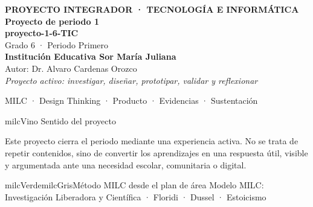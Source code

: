 \documentclass[11pt,letterpaper]{article}
\begin{document}
\thispagestyle{empty}

\vspace*{.85cm}
\begin{tcolorbox}[
  enhanced,colback=milcVino,colframe=milcVino,arc=12mm,width=.86\textwidth,
  boxrule=0pt,left=12mm,right=12mm,top=11mm,bottom=11mm,center,
  overlay={\draw[milcMagenta,line width=2pt,dash pattern=on 9pt off 8pt,rounded corners=10mm]
  ([xshift=7mm,yshift=-7mm]frame.north west) rectangle ([xshift=-7mm,yshift=7mm]frame.south east);}]
  \centering
  {\sffamily\bfseries\color{white}\fontsize{15}{17}\selectfont PROYECTO INTEGRADOR · TECNOLOGÍA E INFORMÁTICA}\\[1.0cm]
  {\sffamily\bfseries\color{white}\fontsize{30}{33}\selectfont Proyecto de periodo 1}\\[3mm]
  {\sffamily\bfseries\color{milcMostaza}\fontsize{25}{28}\selectfont proyecto-1-6-TIC}\\[8mm]
  {\sffamily\color{white}\Large Grado 6 · Periodo Primero}\\[1.0cm]
  {\sffamily\bfseries\color{white}\large Institución Educativa Sor María Juliana}\\[2mm]
  {\sffamily\color{white}Autor: Dr. Alvaro Cardenas Orozco}\\[4mm]
  {\sffamily\itshape\color{white}Proyecto activo: investigar, diseñar, prototipar, validar y reflexionar}
\end{tcolorbox}
\vfill
\begin{tcolorbox}[enhanced,colback=milcVino!72!black,colframe=milcVino!72!black,arc=5mm,boxrule=0pt,width=.86\textwidth,left=6mm,right=6mm,top=4mm,bottom=4mm,center]
{\color{white}\sffamily\small MILC · Design Thinking · Producto · Evidencias · Sustentación}
\end{tcolorbox}

\newpage
\begin{titlebox}{milcVino}
Sentido del proyecto
\end{titlebox}
\begin{multicols}{2}
Este proyecto cierra el periodo mediante una experiencia activa. No se trata de repetir contenidos, sino de convertir los aprendizajes en una respuesta útil, visible y argumentada ante una necesidad escolar, comunitaria o digital.

\columnbreak
\begin{softbox}{milcVerde}{milcGris}{Método MILC desde el plan de área}
Modelo MILC: Investigación Liberadora y Científica · Floridi · Dussel · Estoicismo
\end{softbox}
\end{multicols}
\end{document}
